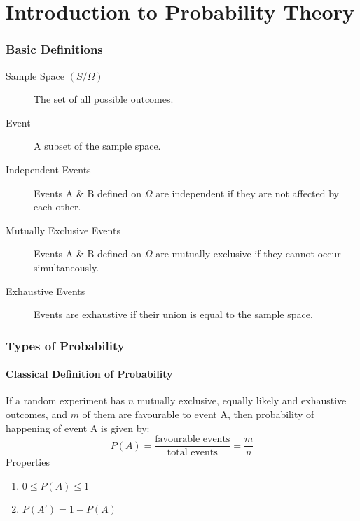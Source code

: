 \documentclass[
10pt, %
a4paper, %
]{report}
\begin{document}
\pagestyle{myheadings} %



\thispagestyle{plain} %

\printtitle %


\part{Introduction to Probability Theory}

\section{Basic Definitions}
\begin{description}
\item[Sample Space \((S/\Omega)\)] The set of all possible outcomes.
\item[Event] A subset of the sample space.
\item[Independent Events] Events A \& B defined on \(\Omega\) are independent if they are not affected  by each other.
\item[Mutually Exclusive Events] Events A \& B defined on \(\Omega\) are mutually exclusive if they cannot occur simultaneously.
\item[Exhaustive Events] Events are exhaustive if their union is equal to the sample space.
\end{description}



\section{Types of Probability}
\subsection{Classical Definition of Probability}
    If a random experiment has \(n\) mutually exclusive, equally likely and exhaustive outcomes, and \(m\) of them are favourable to event A, then probability of happening of event A is given by:
    \[
    P(A)=\frac{\text{favourable events}}{\text{total events}}=\frac{m}{n}
    \]
Properties
\begin{enumerate}
\item \(0\leq P(A) \leq 1\)
\item \(P(A')=1-P(A)\)
\end{enumerate}
\end{document}
